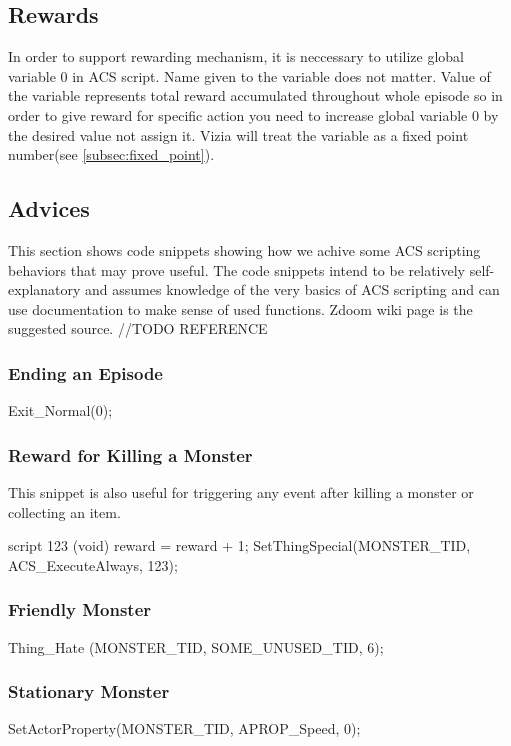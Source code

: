 	\subsection{Rewards}
		In order to support rewarding mechanism, it is neccessary to utilize global variable 0 in ACS script. Name given to the variable does not matter. Value of the variable represents total reward accumulated throughout whole episode so in order to give reward for specific action you need to increase global variable 0 by the desired value not assign it. Vizia will treat the variable as a fixed point number(see \ref{subsec:fixed_point}).

	\subsection{Advices}
		This section shows code snippets showing how we achive some ACS scripting behaviors that may prove useful. The code snippets intend to be relatively self-explanatory and assumes knowledge of the very basics of ACS scripting and can use documentation to make sense of used functions. Zdoom wiki page is the suggested source. //TODO REFERENCE

		\subsubsection*{Ending an Episode}

			\begin{clinee}
Exit_Normal(0);
			\end{clinee}
		\subsubsection*{Reward for Killing a Monster} This snippet is also useful for triggering any event after killing a monster or collecting an item.
			\begin{clinee}
script 123 (void)
{
	reward = reward + 1;
}
SetThingSpecial(MONSTER_TID, ACS_ExecuteAlways, 123);
			\end{clinee}
\subsubsection*{Friendly Monster}
			\begin{clinee}
Thing_Hate (MONSTER_TID, SOME_UNUSED_TID, 6);
			\end{clinee}
		\subsubsection*{Stationary Monster}
			\begin{clinee}
SetActorProperty(MONSTER_TID, APROP_Speed, 0);
			\end{clinee}
